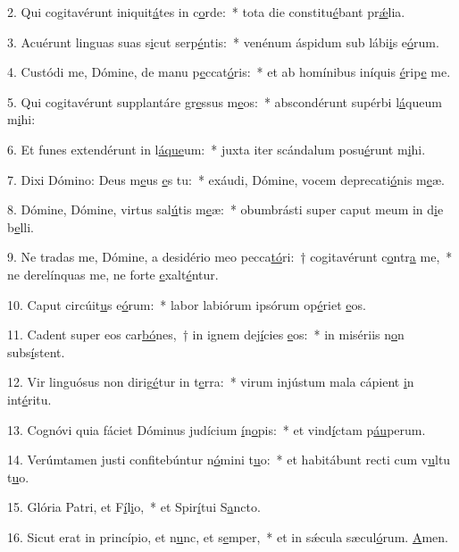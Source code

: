 2. Qui cogitavérunt iniquit\uline{á}tes in c\uline{o}rde:~* tota die constitu\uline{é}bant pr\uline{ǽ}lia.\par 
3. Acuérunt linguas suas s\uline{i}cut serp\uline{é}ntis:~* venénum áspidum sub lábi\uline{i}s e\uline{ó}rum.\par 
4. Custódi me, Dómine, de manu p\uline{e}ccat\uline{ó}ris:~* et ab homínibus iníquis \uline{é}rip\uline{e} me.\par 
5. Qui cogitavérunt supplantáre gr\uline{e}ssus m\uline{e}os:~* abscondérunt supérbi l\uline{á}queum m\uline{i}hi:\par 
6. Et funes extendérunt in l\uline{á}\uline{que}um:~* juxta iter scándalum posu\uline{é}runt m\uline{i}hi.\par 
7. Dixi Dómino: Deus m\uline{e}us \uline{e}s tu:~* exáudi, Dómine, vocem deprecati\uline{ó}nis m\uline{e}æ.\par 
8. Dómine, Dómine, virtus sal\uline{ú}tis m\uline{e}æ:~* obumbrásti super caput meum in d\uline{i}e b\uline{e}lli.\par 
9. Ne tradas me, Dómine, a desidério meo pecca\uline{tó}ri:~† cogitavérunt c\uline{o}ntr\uline{a} me,~* ne derelínquas me, ne forte \uline{e}xalt\uline{é}ntur.\par 
10. Caput circúit\uline{u}s e\uline{ó}rum:~* labor labiórum ipsórum op\uline{é}riet \uline{e}os.\par 
11. Cadent super eos car\uline{bó}nes,~† in ignem dej\uline{í}cies \uline{e}os:~* in misériis n\uline{o}n subs\uline{í}stent.\par 
12. Vir linguósus non dirig\uline{é}tur in t\uline{e}rra:~* virum injústum mala cápient \uline{i}n int\uline{é}ritu.\par 
13. Cognóvi quia fáciet Dóminus judícium \uline{í}n\uline{o}pis:~* et vind\uline{í}ctam p\uline{áu}perum.\par 
14. Verúmtamen justi confitebúntur n\uline{ó}mini t\uline{u}o:~* et habitábunt recti cum v\uline{u}ltu t\uline{u}o.\par 
15. Glória Patri, et F\uline{í}l\uline{i}o,~* et Spir\uline{í}tui S\uline{a}ncto.\par 
16. Sicut erat in princípio, et n\uline{u}nc, et s\uline{e}mper,~* et in sǽcula sæcul\uline{ó}rum. \uline{A}men.\par 
